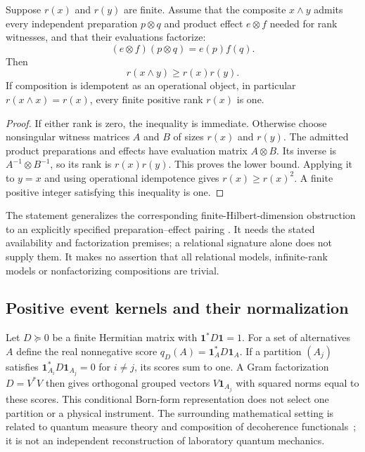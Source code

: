\begin{theorem}
Suppose \(r(x)\) and \(r(y)\) are finite.  Assume that the composite
\(x\wedge y\) admits every independent preparation \(p\otimes q\) and
product effect \(e\otimes f\) needed for rank witnesses, and that their
evaluations factorize:
\[
 (e\otimes f)(p\otimes q)=e(p)f(q).
\]
Then
\[
 r(x\wedge y)\ge r(x)r(y).
\]
If composition is idempotent as an operational object, in particular
\(r(x\wedge x)=r(x)\), every finite positive rank \(r(x)\) is one.
\end{theorem}
\begin{proof}
If either rank is zero, the inequality is immediate. Otherwise choose nonsingular witness matrices \(A\) and \(B\) of sizes \(r(x)\)
and \(r(y)\).  The admitted product preparations and effects have
evaluation matrix \(A\otimes B\).  Its inverse is
\(A^{-1}\otimes B^{-1}\), so its rank is \(r(x)r(y)\).  This proves
the lower bound.  Applying it to \(y=x\) and using operational
idempotence gives \(r(x)\ge r(x)^2\).  A finite positive integer
satisfying this inequality is one.
\end{proof}

The statement generalizes the corresponding finite-Hilbert-dimension
obstruction to an explicitly specified preparation--effect pairing
\cite[Proposition~11]{rec:operational-study}.  It needs the stated
availability and factorization premises; a relational signature alone
does not supply them.  It makes no assertion that all relational
models, infinite-rank models or nonfactorizing compositions are trivial.

\subsection{Positive event kernels and their normalization}
\label{str:kernels}
Let $D\succeq0$ be a finite Hermitian matrix with $\mathbf1^*D\mathbf1=1$. For a set of alternatives $A$ define the real nonnegative score $q_D(A)=\mathbf1_A^*D\mathbf1_A$. If a partition $(A_j)$ satisfies $\mathbf1_{A_i}^*D\mathbf1_{A_j}=0$ for $i\ne j$, its scores sum to one. A Gram factorization $D=V^*V$ then gives orthogonal grouped vectors $V\mathbf1_{A_j}$ with squared norms equal to these scores. This conditional Born-form representation does not select one partition or a physical instrument. The surrounding mathematical setting is related to quantum measure theory and composition of decoherence functionals~\cite{sorkin,boes}; it is not an independent reconstruction of laboratory quantum mechanics.


